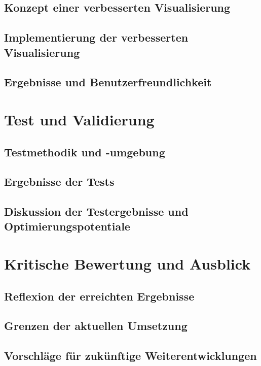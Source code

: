 \documentclass[a4paper, 12pt]{article} %
\begin{document}
\subsection{Konzept einer verbesserten Visualisierung}
\subsection{Implementierung der verbesserten Visualisierung}
\subsection{Ergebnisse und Benutzerfreundlichkeit}

\section{Test und Validierung}
\subsection{Testmethodik und -umgebung}
\subsection{Ergebnisse der Tests}
\subsection{Diskussion der Testergebnisse und Optimierungspotentiale}

\section{Kritische Bewertung und Ausblick}
\subsection{Reflexion der erreichten Ergebnisse}
\subsection{Grenzen der aktuellen Umsetzung}
\subsection{Vorschläge für zukünftige Weiterentwicklungen}


\clearpage
\begingroup
\renewcommand{\bibfont}{\fontsize{13pt}{12pt}\selectfont}  
\sloppy
\nocite{*}
\printbibliography
\endgroup
\end{document}
